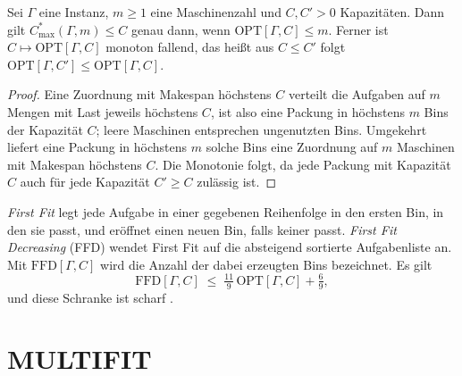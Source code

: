 \begin{lemma}[Dualität]
\label{lem:dualitaet}
Sei $\Gamma$ eine Instanz, $m \ge 1$ eine Maschinenzahl und $C, C' > 0$ Kapazitäten.
Dann gilt $C^{*}_{\max}(\Gamma, m) \le C$ genau dann, wenn $\mathrm{OPT}[\Gamma, C] \le m$.
Ferner ist $C \mapsto \mathrm{OPT}[\Gamma, C]$ monoton fallend, das heißt aus $C \le C'$ folgt
$\mathrm{OPT}[\Gamma, C'] \le \mathrm{OPT}[\Gamma, C]$.
\end{lemma}

\begin{proof}
Eine Zuordnung mit Makespan höchstens $C$ verteilt die Aufgaben auf $m$ Mengen mit Last jeweils
höchstens $C$, ist also eine Packung in höchstens $m$ Bins der Kapazität $C$; leere Maschinen
entsprechen ungenutzten Bins.
Umgekehrt liefert eine Packung in höchstens $m$ solche Bins eine Zuordnung auf $m$ Maschinen mit
Makespan höchstens $C$.
Die Monotonie folgt, da jede Packung mit Kapazität $C$ auch für jede Kapazität $C' \ge C$ zulässig
ist.
\end{proof}

\emph{First Fit} legt jede Aufgabe in einer gegebenen Reihenfolge in den ersten Bin, in den sie
passt, und eröffnet einen neuen Bin, falls keiner passt.
\emph{First Fit Decreasing} (FFD) wendet First Fit auf die absteigend sortierte
Aufgabenliste an.
Mit $\mathrm{FFD}[\Gamma, C]$ wird die Anzahl der dabei erzeugten Bins bezeichnet.
Es gilt
\begin{equation}
  \mathrm{FFD}[\Gamma, C] \;\le\; \tfrac{11}{9}\,\mathrm{OPT}[\Gamma, C] + \tfrac{6}{9},
  \label{eq:ffd-guete}
\end{equation}
und diese Schranke ist scharf \cite{dosa2007}.

\section{MULTIFIT}
\label{sec:multifit}

